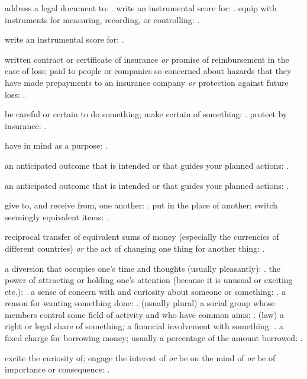   address a legal document to: . write an instrumental score for: . equip with instruments for measuring, recording, or controlling: .

  write an instrumental score for: .

  written contract or certificate of insurance \textit{or} promise of reimbursement in the case of loss; paid to people or companies so concerned about hazards that they have made prepayments to an insurance company \textit{or} protection against future loss: .

  be careful or certain to do something; make certain of something: . protect by insurance: .

  have in mind as a purpose: .

  an anticipated outcome that is intended or that guides your planned actions: .

  an anticipated outcome that is intended or that guides your planned actions: .

  give to, and receive from, one another: . put in the place of another; switch seemingly equivalent items: .

  reciprocal transfer of equivalent sums of money (especially the currencies of different countries) \textit{or} the act of changing one thing for another thing: .

  a diversion that occupies one's time and thoughts (usually pleasantly):   . the power of attracting or holding one's attention (because it is unusual or exciting etc.): . a sense of concern with and curiosity about someone or something: . a reason for wanting something done: . (usually plural) a social group whose members control some field of activity and who have common aims: . (law) a right or legal share of something; a financial involvement with something: . a fixed charge for borrowing money; usually a percentage of the amount borrowed: .

  excite the curiosity of; engage the interest of \textit{or} be on the mind of \textit{or} be of importance or consequence: .

